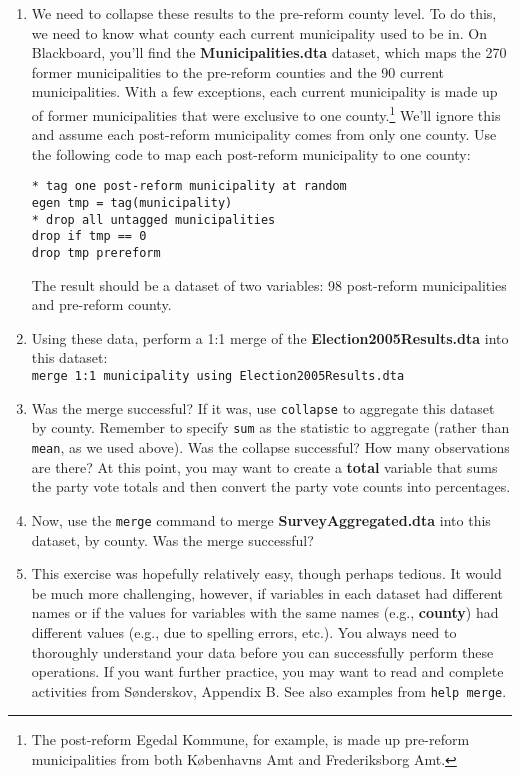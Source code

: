 \documentclass[a4paper,12pt]{article}
\begin{document}
\begin{enumerate}
\item We need to collapse these results to the pre-reform county level. To do this, we need to know what county each current municipality used to be in. On Blackboard, you'll find the \textbf{Municipalities.dta} dataset, which maps the 270 former municipalities to the pre-reform counties and the 90 current municipalities. With a few exceptions, each current municipality is made up of former municipalities that were exclusive to one county.\footnote{The post-reform Egedal Kommune, for example, is made up pre-reform municipalities from both K{\o}benhavns Amt and Frederiksborg Amt.} We'll ignore this and assume each post-reform municipality comes from only one county. Use the following code to map each post-reform municipality to one county:

\begin{verbatim}
* tag one post-reform municipality at random
egen tmp = tag(municipality)
* drop all untagged municipalities
drop if tmp == 0
drop tmp prereform
\end{verbatim}

The result should be a dataset of two variables: 98 post-reform municipalities and pre-reform county.

\item Using these data, perform a 1:1 merge of the \textbf{Election2005Results.dta} into this dataset:\\
\texttt{merge 1:1 municipality using Election2005Results.dta}

\item Was the merge successful? If it was, use \texttt{collapse} to aggregate this dataset by county. Remember to specify \texttt{sum} as the statistic to aggregate (rather than \texttt{mean}, as we used above). Was the collapse successful? How many observations are there? At this point, you may want to create a \textbf{total} variable that sums the party vote totals and then convert the party vote counts into percentages.


\item Now, use the \texttt{merge} command to merge \textbf{SurveyAggregated.dta} into this dataset, by county. Was the merge successful?

\item This exercise was hopefully relatively easy, though perhaps tedious. It would be much more challenging, however, if variables in each dataset had different names or if the values for variables with the same names (e.g., \textbf{county}) had different values (e.g., due to spelling errors, etc.). You always need to thoroughly understand your data before you can successfully perform these operations. If you want further practice, you may want to read and complete activities from S{\o}nderskov, Appendix B. See also examples from \texttt{help merge}.


\end{enumerate}
\end{document}
